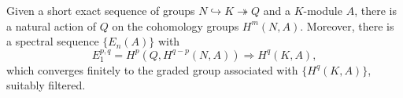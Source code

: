 Given a short exact sequence of groups $N \hookrightarrow K \twoheadrightarrow Q$ and a $K$-module $A$, there is a natural action of $Q$ on the cohomology groups $H^m(N, A)$. Moreover, there is a spectral sequence $\{E_n(A)\}$ with
$$E_1^{p,q} = H^p(Q, H^{q-p}(N, A)) \Rightarrow H^q(K, A),$$
which converges finitely to the graded group associated with $\{H^q(K, A)\}$, suitably filtered.